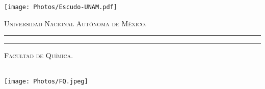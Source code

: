 \documentclass[11pt,letter
								]
								{article}
\begin{document}



\doublespacing
\begin{Large}

    \begin{titlepage}
        \thispagestyle{empty}
        \begin{minipage}[c][0.01\textheight][c]{0.19\textwidth}
            \begin{center}
                \texttt{[image: Photos/Escudo-UNAM.pdf]}
				\hspace{1cm}
            \end{center}
        \end{minipage}
        \begin{minipage}[c][0.195\textheight][t]{0.75\textwidth}
            \begin{center}
                \vspace{0.0cm}
                \textsc{Universidad Nacional Aut\'onoma de M\'exico.}\\[0.5cm]
                \vspace{0.3cm}
                \hrule height2.5pt
                \vspace{.2cm}
                \hrule height1pt
                \vspace{.8cm}
                \textsc{Facultad de Química.}
				\vskip 1cm

				\end{center}
        \end{minipage}

        \begin{minipage}[c][0.81\textheight][t]{0.18\textwidth}
            \vspace*{5mm}
            \begin{center}
                \hskip2.0mm
                \vrule width1pt height13cm
                \vspace{5mm}
                \hskip2pt
                \vrule width2.5pt height13cm
                \hskip2mm
                \vrule width1pt height13cm \\
                \vspace{5mm}
                \texttt{[image: Photos/FQ.jpeg]}
            \end{center}
        \end{minipage}
        \begin{minipage}[c][0.81\textheight][t]{0.75\textwidth}
            \begin{center}
                \vspace{0cm}


\end{center}
\end{minipage}
\end{titlepage}
\end{Large}
\end{document}

